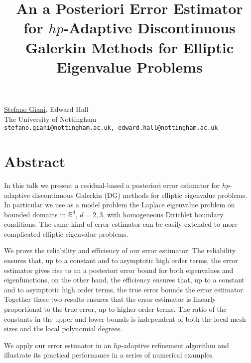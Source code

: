 \title{An a Posteriori Error Estimator for $hp$-Adaptive Discontinuous Galerkin Methods for Elliptic Eigenvalue Problems}
\author{} \institute{}
\maketitle

\begin{center}
{\large \underline {Stefano Giani}, Edward Hall}\\
The University of Nottingham\\
{\tt stefano.giani@nottingham.ac.uk, edward.hall@nottingham.ac.uk}
\end{center}

\section*{Abstract}
In this talk we present a residual-based a posteriori error estimator for $hp$-adaptive discontinuous Galerkin (DG) methods for elliptic eigenvalue problems. In particular we use as a model problem the Laplace eigenvalue problem on bounded domains in $\mathbb{R}^d$, $d=2,3$, with homogeneous Dirichlet boundary conditions. The same kind of error estimator can be easily extended to more complicated elliptic eigenvalue problems.

We prove the reliability and efficiency of our error estimator. The reliability ensures that,  up to a constant and to asymptotic high order terms, the error estimator gives rise to an a posteriori error bound for both eigenvalues and eigenfunctions, on the other hand, the efficiency ensures that, up to a constant and to asymptotic high order terms, the true error bounds the error estimator. Together these two results ensures that the error estimator is linearly proportional to the true error, up to higher order terms. The ratio of the constants in the upper and lower bounds is independent of both the local mesh sizes and the local polynomial degrees. 

We apply our error estimator in an $hp$-adaptive refinement algorithm and illustrate its practical performance in a series of numerical examples. 

